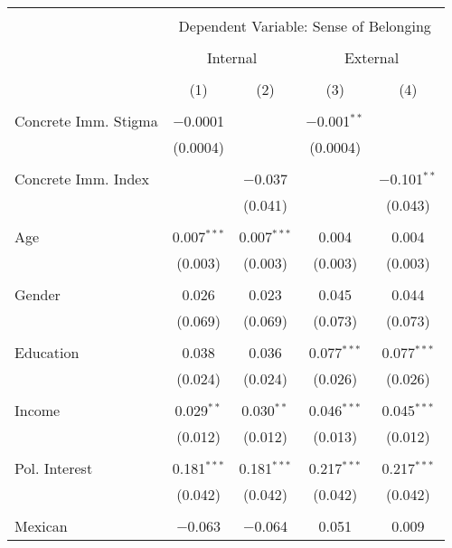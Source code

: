 
\begin{table}[!htbp] \centering 
  \caption{} 
  \label{} 
\begin{tabular}{@{\extracolsep{5pt}}lcccc} 
\\[-1.8ex]\hline 
\hline \\[-1.8ex] 
 & \multicolumn{4}{c}{Dependent Variable: Sense of Belonging} \\ 
\cline{2-5} 
\\[-1.8ex] & \multicolumn{2}{c}{Internal} & \multicolumn{2}{c}{External} \\ 
\\[-1.8ex] & (1) & (2) & (3) & (4)\\ 
\hline \\[-1.8ex] 
 Concrete Imm. Stigma & $-$0.0001 &  & $-$0.001$^{**}$ &  \\ 
  & (0.0004) &  & (0.0004) &  \\ 
  & & & & \\ 
 Concrete Imm. Index &  & $-$0.037 &  & $-$0.101$^{**}$ \\ 
  &  & (0.041) &  & (0.043) \\ 
  & & & & \\ 
 Age & 0.007$^{***}$ & 0.007$^{***}$ & 0.004 & 0.004 \\ 
  & (0.003) & (0.003) & (0.003) & (0.003) \\ 
  & & & & \\ 
 Gender & 0.026 & 0.023 & 0.045 & 0.044 \\ 
  & (0.069) & (0.069) & (0.073) & (0.073) \\ 
  & & & & \\ 
 Education & 0.038 & 0.036 & 0.077$^{***}$ & 0.077$^{***}$ \\ 
  & (0.024) & (0.024) & (0.026) & (0.026) \\ 
  & & & & \\ 
 Income & 0.029$^{**}$ & 0.030$^{**}$ & 0.046$^{***}$ & 0.045$^{***}$ \\ 
  & (0.012) & (0.012) & (0.013) & (0.012) \\ 
  & & & & \\ 
 Pol. Interest & 0.181$^{***}$ & 0.181$^{***}$ & 0.217$^{***}$ & 0.217$^{***}$ \\ 
  & (0.042) & (0.042) & (0.042) & (0.042) \\ 
  & & & & \\ 
 Mexican & $-$0.063 & $-$0.064 & 0.051 & 0.009 \\ 

\end{tabular}
\end{table}

